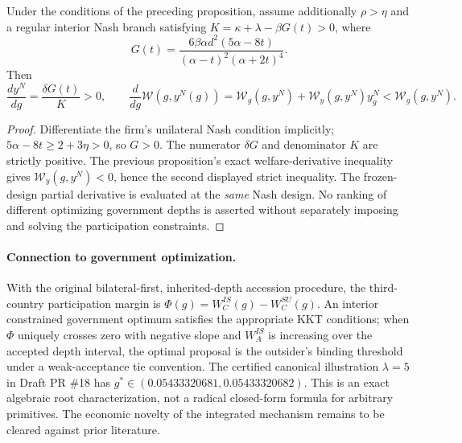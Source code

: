 \begin{proposition}
Under the conditions of the preceding proposition, assume additionally
$\rho>\eta$ and a regular interior Nash branch satisfying
$K=\kappa+\lambda-\beta G(t)>0$, where
\[
 G(t)=\frac{6\beta\alpha d^2(5\alpha-8t)}
 {(\alpha-t)^2(\alpha+2t)^4}.
\]
Then
\[
 \frac{dy^N}{dg}=\frac{\delta G(t)}{K}>0,
 \qquad
 \frac{d}{dg}\mathcal W(g,y^N(g))
 =\mathcal W_g(g,y^N)+\mathcal W_y(g,y^N)y^N_g
 <\mathcal W_g(g,y^N).
\]
\end{proposition}
\begin{proof}
Differentiate the firm's unilateral Nash condition implicitly;
$5\alpha-8t\ge2+3\eta>0$, so $G>0$.
The numerator $\delta G$ and denominator $K$ are strictly positive.
The previous proposition's exact welfare-derivative inequality gives
$\mathcal W_y(g,y^N)<0$, hence the second displayed strict inequality.
The frozen-design partial derivative is evaluated at the \emph{same}
Nash design. No ranking of different optimizing government depths is
asserted without separately imposing and solving the participation constraints.
\end{proof}

\paragraph{Connection to government optimization.}
With the original bilateral-first, inherited-depth accession procedure,
the third-country participation margin is
$\Phi(g)=W_C^{IS}(g)-W_C^{SU}(g)$.
An interior constrained government optimum satisfies the appropriate
KKT conditions; when $\Phi$ uniquely crosses zero with negative slope
and $W_A^{IS}$ is increasing over the accepted depth interval, the
optimal proposal is the outsider's binding threshold under a
weak-acceptance tie convention.
The certified canonical illustration $\lambda=5$ in Draft PR \#18
has $g^*\in(0.05433320681,0.05433320682)$.
This is an exact algebraic root characterization, not a radical
closed-form formula for arbitrary primitives. The economic novelty
of the integrated mechanism remains to be cleared against prior literature.



